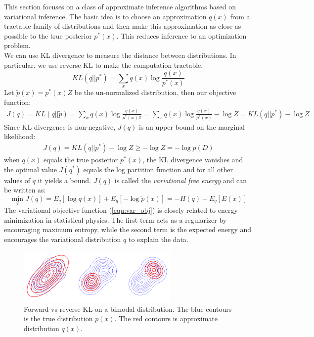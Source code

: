 This section focuses on a class of approximate inference algorithms based on variational inference. The basic idea is to choose an approximation $q(x)$ from a tractable family of distributions and then make this approximation as close as possible to the true posterior $p^{\ast}(x)$. This reduces inference to an optimization problem.\\

We can use KL divergence to measure the distance between distributions. In particular, we use reverse KL to make the computation tractable.
\begin{equation}
    KL(q||p^{\ast}) = \sum_x q(x) \log \frac{q(x)}{p^{\ast}(x)}
\end{equation}
Let $\tilde{p}(x)=p^{\ast}(x)Z$ be the un-normalized distribution, then our objective function:
\begin{eqnarray}
    J(q) = KL(q||\tilde{p})= \sum_x q(x) \log \frac{q(x)}{p^{\ast}(x)Z} 
    = \sum_x q(x) \log \frac{q(x)}{p^{\ast}(x)} - \log Z = KL(q||p^{\ast}) - \log Z
\end{eqnarray}
Since KL divergence is non-negative, $J(q)$ is an upper bound on the marginal likelihood:
\begin{eqnarray}
    J(q) = KL(q||p^{\ast}) - \log Z \geq -\log Z = -\log p(D)
\end{eqnarray}
when $q(x)$ equals the true posterior $p^{\ast}(x)$, the KL divergence vanishes and the optimal value $J(q^{\ast})$ equals the log partition function and for all other values of $q$ it yields a bound. $J(q)$ is called the \textit{variational free energy} and can be written as:
\begin{equation}\label{equ:var_obj}
   \min_q J(q) = E_{q}[\log q(x)]+E_{q}[-\log \tilde{p}(x)] = -H(q) + E_q[E(x)]
\end{equation}
The variational objective function (\ref{equ:var_obj}) is closely related to energy minimization in statistical physics. The first term acts as a regularizer by encouraging maximum entropy, while the second term is the expected energy and encourages the variational distribution $q$ to explain the data. 

\begin{figure}[tbhp]
    \centering
    \includegraphics[width=0.7\textwidth, trim={10 10 10 10}]{figures/kl_bimodal.png}
    \caption{Forward vs reverse KL on a bimodal distribution. The blue contours is the true distribution $p(x)$. The red contours is approximate distribution $q(x)$.}
    \label{fig:kl_bimodal}
\end{figure}

